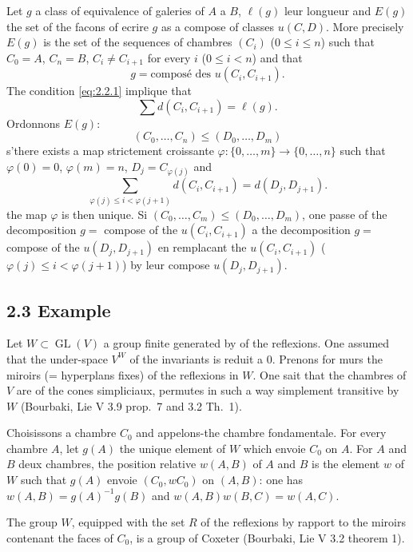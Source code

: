 \documentclass[11pt,a4paper]{article}
\theoremstyle{plain}
\theoremstyle{definition}
\DeclareMathOperator{\GL}{GL}
\begin{document}
Let $g$ a class of equivalence of galeries of $A$ a $B$, $\ell(g)$ leur longueur and $E(g)$ the set of the facons of ecrire $g$ as a compose of classes $u(C,D)$. More precisely $E(g)$ is the set of the sequences of chambres $(C_i)$ ($0 \leq i \leq n$) such that $C_0 = A$, $C_n = B$, $C_i \not= C_{i+1}$ for every $i$ ($0 \leq i < n$) and that
\begin{equation}\label{eq:2.2.1}
g = \text{compos\'e des } u(C_i, C_{i+1}).
\tag{2.2.1}
\end{equation}
The condition \eqref{eq:2.2.1} implique that
\begin{equation}\label{eq:2.2.2}
\sum d(C_i, C_{i+1}) = \ell(g).
\tag{2.2.2}
\end{equation}
Ordonnons $E(g)$:
\[
(C_0, \ldots, C_n) \leq (D_0, \ldots, D_m)
\]
s'there exists a map strictement croissante $\varphi : \{0, \ldots, m\} \to \{0, \ldots, n\}$ such that $\varphi(0) = 0$, $\varphi(m) = n$, $D_j = C_{\varphi(j)}$ and
\[
\sum_{\varphi(j) \leq i < \varphi(j+1)} d(C_i, C_{i+1}) = d(D_j, D_{j+1}).
\]
the map $\varphi$ is then unique. Si $(C_0, \ldots, C_m) \leq (D_0, \ldots, D_m)$, one passe of the decomposition $g =$ compose of the $u(C_i, C_{i+1})$ a the decomposition $g =$ compose of the $u(D_j, D_{j+1})$ en remplacant the $u(C_i, C_{i+1})$ ($\varphi(j) \leq i < \varphi(j+1)$) by leur compose $u(D_j, D_{j+1})$.

\subsection*{2.3 Example}\label{sec:2.3}

Let $W \subset \GL(V)$ a group finite generated by of the reflexions. One assumed that the under-space $V^W$ of the invariants is reduit a $0$. Prenons for murs the miroirs (= hyperplans fixes) of the reflexions in $W$. One sait that the chambres of $V$ are of the cones simpliciaux, permutes in such a way simplement transitive by $W$ (Bourbaki, Lie V 3.9 prop.~7 and 3.2 Th.~1).

Choisissons a chambre $C_0$ and appelons-the chambre fondamentale. For every chambre $A$, let $g(A)$ the unique element of $W$ which envoie $C_0$ on $A$. For $A$ and $B$ deux chambres, the position relative $w(A,B)$ of $A$ and $B$ is the element $w$ of $W$ such that $g(A)$ envoie $(C_0, wC_0)$ on $(A,B)$: one has $w(A,B) = g(A)^{-1} g(B)$ and $w(A,B) w(B,C) = w(A,C)$.

The group $W$, equipped with the set $R$ of the reflexions by rapport to the miroirs contenant the faces of $C_0$, is a group of Coxeter (Bourbaki, Lie V 3.2 theorem 1).
\end{document}
